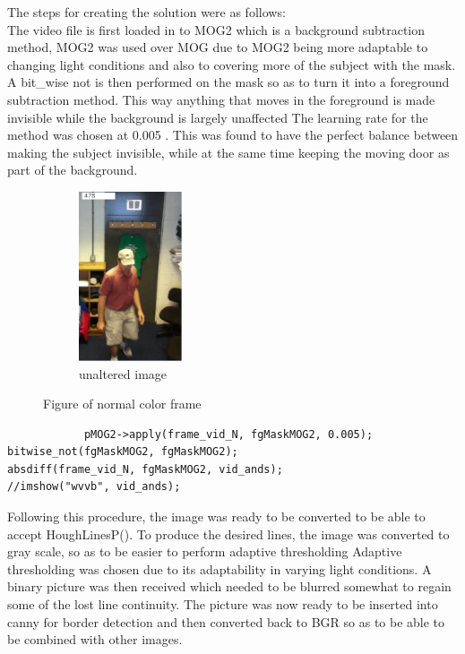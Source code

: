 \documentclass{article}
\begin{document}
The steps for  creating the solution were as follows:\\

The video file is first loaded in to MOG2 which is a background subtraction method, MOG2 was used over MOG due to MOG2 being more adaptable to changing light conditions and also to covering more of the subject with the mask.\\
A bit_wise not is then performed on the mask so as to turn it into a foreground subtraction method. This way anything that moves in the foreground is made invisible while the background is largely unaffected The learning rate for the method was chosen at 0.005 . This was found to have the perfect balance between making the subject invisible, while at the same time keeping the moving door as part of the background.\\




\begin{figure}[H]
\begin{subfigure}{0.5\textwidth}
\includegraphics[width=0.5\linewidth, height=5cm]{prof_color.png} 
\caption{unaltered image}
\label{fig:subim1}
\end{subfigure}

\caption{Figure of normal color frame}
\label{fig:image2}
\end{figure}

\begin{lstlisting}
			pMOG2->apply(frame_vid_N, fgMaskMOG2, 0.005);
bitwise_not(fgMaskMOG2, fgMaskMOG2);
absdiff(frame_vid_N, fgMaskMOG2, vid_ands);
//imshow("wvvb", vid_ands);
\end{lstlisting}

Following this procedure, the image was ready to be converted to be able to accept HoughLinesP(). To produce the desired lines, the image was converted to gray scale, so as to be easier to perform adaptive thresholding Adaptive thresholding was chosen due to its adaptability in varying light conditions. A binary picture was then received which needed to be blurred somewhat to regain some of the lost line continuity. The picture was now ready to be inserted into canny for border detection and then converted back to BGR so as to be able to be combined with other images.
\end{document}
